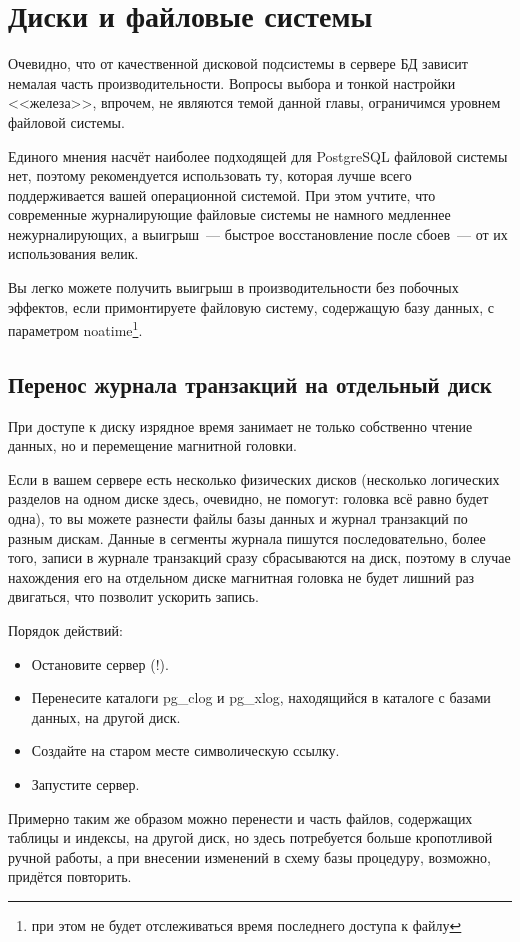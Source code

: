 \section{Диски и файловые системы}
Очевидно, что от качественной дисковой подсистемы в сервере БД зависит немалая часть производительности. Вопросы выбора и 
тонкой настройки <<железа>>, впрочем, не являются темой данной главы, ограничимся уровнем файловой системы.

Единого мнения насчёт наиболее подходящей для PostgreSQL файловой системы нет, поэтому рекомендуется использовать ту, которая лучше 
всего поддерживается вашей операционной системой. При этом учтите, что современные журналирующие файловые системы не намного 
медленнее нежурналирующих, а выигрыш~--- быстрое восстановление после сбоев~--- от их использования велик.

Вы легко можете получить выигрыш в производительности без побочных эффектов, если примонтируете файловую систему, 
содержащую базу данных, с параметром noatime\footnote{при этом не будет отслеживаться время последнего доступа к файлу}.

\subsection{Перенос журнала транзакций на отдельный диск}
При доступе к диску изрядное время занимает не только собственно чтение данных, но и перемещение магнитной головки.

Если в вашем сервере есть несколько физических дисков (несколько логических разделов на одном диске здесь, 
очевидно, не помогут: головка всё равно будет одна), то вы можете разнести файлы базы данных и журнал транзакций по разным 
дискам. Данные в сегменты журнала пишутся последовательно, более того, записи в журнале транзакций сразу сбрасываются на диск, 
поэтому в случае нахождения его на отдельном диске магнитная головка не будет лишний раз двигаться, что позволит ускорить запись.

Порядок действий:
\begin{itemize}
\item Остановите сервер (!).
\item Перенесите каталоги pg\_clog и pg\_xlog, находящийся в каталоге с базами данных, на другой диск. 
\item Создайте на старом месте символическую ссылку.
\item Запустите сервер.
\end{itemize}

Примерно таким же образом можно перенести и часть файлов, содержащих таблицы и индексы, на другой диск, но здесь 
потребуется больше кропотливой ручной работы, а при внесении изменений в схему базы процедуру, возможно, придётся повторить.


